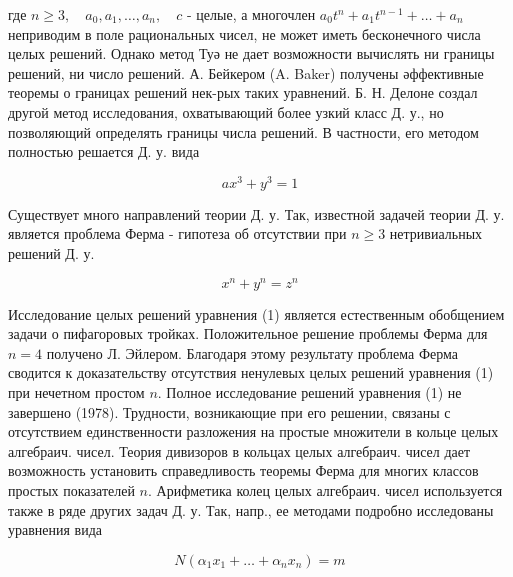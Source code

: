 \documentclass[10pt]{article}
\begin{document}
где $n \geqslant 3, \quad a_{0}, a_{1}, \ldots, a_{n}, \quad c$ - целые, а многочлен $a_{0} t^{n}+a_{1} t^{n-1}+\ldots+a_{n}$ неприводим в поле рациональных чисел, не может иметь бесконечного числа целых решений. Однако метод Туә не дает возможности вычислять ни границы решений, ни число решений. А. Бейкером (A. Baker) получены әффективные теоремы о границах решений нек-рых таких уравнений. Б. Н. Делоне создал другой метод исследования, охватывающий более узкий класс Д. у., но позволяющий определять границы числа решений. В частности, его методом полностью решается Д. у. вида



\[

a x^{3}+y^{3}=1

\]



Существует много направлений теории Д. у. Так, известной задачей теории Д. у. является проблема Ферма - гипотеза об отсутствии при $n \geqslant 3$ нетривиальных решений Д. у.



\[

x^{n}+y^{n}=z^{n}

\]



Исследование целых решений уравнения (1) является естественным обобщением задачи о пифагоровых тройках. Положительное решение проблемы Ферма для $n=4$ получено Л. Эйлером. Благодаря этому результату проблема Ферма сводится к доказательству отсутствия ненулевых целых решений уравнения (1) при нечетном простом $n$. Полное исследование решений уравнения (1) не завершено (1978). Трудности, возникающие при его решении, связаны с отсутствием единственности разложения на простые множители в кольце целых алгебраич. чисел. Теория дивизоров в кольцах целых алгебраич. чисел дает возможность установить справедливость теоремы Ферма для многих классов простых показателей $n$. Арифметика колец целых алгебраич. чисел используется также в ряде других задач Д. у. Так, напр., ее методами подробно исследованы уравнения вида



\[

N\left(\alpha_{1} x_{1}+\ldots+\alpha_{n} x_{n}\right)=m

\]
\end{document}
